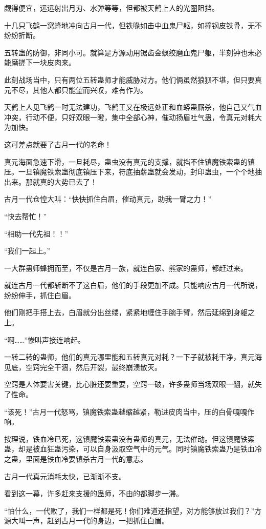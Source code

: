 \begin{this_body}
觑得便宜，远远射出月刃、水弹等等，但都被天鹤上人的光圈阻挡。

十几只飞鹤一窝蜂地冲向古月一代，但铁喙如击中血鬼尸躯，如撞钢皮铁骨，无不纷纷折断。

五转蛊的防御，非同小可。就算是方源动用锯齿金蜈绞磨血鬼尸躯，半刻钟也未必能磨搓下一块皮肉来。

此刻战场当中，只有两位五转蛊师才能威胁对方。他们俩虽然狼狈不堪，但只要真元不尽，其他人都只能望而兴叹，难有作为。

天鹤上人见飞鹤一时无法建功，飞鹤王又在极远处正和血蟒蛊厮杀，他自己又气血冲突，行动不便，只好双眼一瞪，集中全部心神，催动扬眉吐气蛊，令真元对耗大为加快。

这可差点就要了古月一代的老命！

真元海面急速下滑，一旦耗尽，蛊虫没有真元的支撑，就挡不住镇魔铁索蛊的镇压。一旦镇魔铁索蛊彻底镇压下来，符底抽薪蛊就会发动，封印蛊虫，一个个地抽出来。那就真的大势已去了！

古月一代仓惶大叫：“快快抓住白眉，催动真元，助我一臂之力！”

“快去帮忙！”

“相助一代先祖！！”

“我们一起上。”

一大群蛊师蜂拥而至，不仅是古月一族，就连白家、熊家的蛊师，都赶过来。

就连古月一代都斩断不了这白眉，他们的手段更加不成。只能响应古月一代所说，纷纷伸手，抓住白眉。

他们刚把手搭上去，白眉就分出丝缕，紧紧地缠住手腕手臂，然后延绵到身躯之上。

“啊……”惨叫声接连响起。

一转二转的蛊师，他们的真元哪里能和五转真元对耗？一下子就被耗干净，真元海见底，空窍完全干涸，然后开裂，最终崩溃散灭。

空窍是人体要害关键，比心脏还要重要，空窍一破，许多蛊师当场双眼一翻，就失了性命。

“该死！”古月一代怒骂，镇魔铁索蛊越缩越紧，勒进皮肉当中，压的白骨嘎嘎作响。

按理说，铁血冷已死，这镇魔铁索蛊没有蛊师的真元，无法催动。但这镇魔铁索蛊，却是被血狂蛊污染，可以自身汲取空气中的元气。同时镇魔铁索蛊乃是铁血冷之蛊，里面是铁血冷要镇杀古月一代的意志。

古月一代真元消耗太快，已渐渐不支。

看到这一幕，许多赶来支援的蛊师，不由的都脚步一滞。

“怕什么，一代败了，我们一样都是死！你们难道还指望，对方能够放过我们？”方源大叫一声，赶到古月一代的身边，一把抓住白眉。


\end{this_body}

